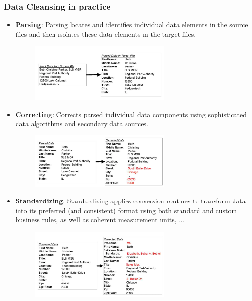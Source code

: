 \documentclass[10pt,a4paper]{article}
\begin{document}
\subsubsection{Data Cleansing in practice}
\begin{itemize}
	\item \textbf{Parsing}: Parsing locates and identifies individual data elements in the source files and then isolates these data elements in the target files.
	\begin{figure}[ht!]
 \hfill \includegraphics[width=200pt]{images/step-parsing}
 \hspace*{\fill}
 \end{figure} 
	\item \textbf{Correcting}: Corrects parsed individual data components using sophisticated data algorithms and secondary data sources.
	\begin{figure}[ht!]
 \hfill \includegraphics[width=200pt]{images/step-correcting}
 \hspace*{\fill}
 \end{figure} 
	\item \textbf{Standardizing}: Standardizing applies conversion routines to transform data into its preferred (and consistent) format using both standard and custom business rules, as well as coherent measurement units, ...
	\begin{figure}[ht!]
 \hfill \includegraphics[width=200pt]{images/step-standardizing}
 \hspace*{\fill}
 \end{figure} 

\end{itemize}
\end{document}
